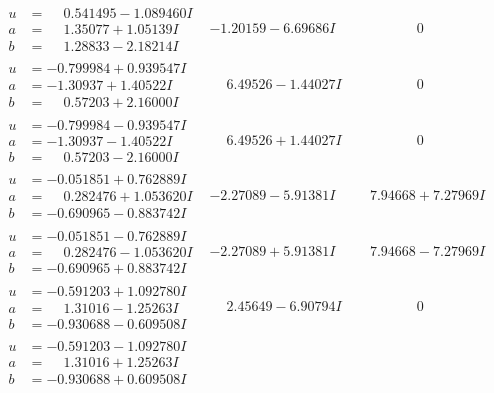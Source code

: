\documentclass[1p]{elsarticle_modified}
\theoremstyle{definition}
\begin{document}
$$\begin{array}{c|c|c}
 \hline 
\begin{aligned}
u &= \phantom{-}0.541495 - 1.089460 I \\
a &= \phantom{-}1.35077 + 1.05139 I \\
b &= \phantom{-}1.28833 - 2.18214 I\end{aligned}
 & -1.20159 - 6.69686 I & \phantom{-0.000000 } 0 \\ \hline\begin{aligned}
u &= -0.799984 + 0.939547 I \\
a &= -1.30937 + 1.40522 I \\
b &= \phantom{-}0.57203 + 2.16000 I\end{aligned}
 & \phantom{-}6.49526 - 1.44027 I & \phantom{-0.000000 } 0 \\ \hline\begin{aligned}
u &= -0.799984 - 0.939547 I \\
a &= -1.30937 - 1.40522 I \\
b &= \phantom{-}0.57203 - 2.16000 I\end{aligned}
 & \phantom{-}6.49526 + 1.44027 I & \phantom{-0.000000 } 0 \\ \hline\begin{aligned}
u &= -0.051851 + 0.762889 I \\
a &= \phantom{-}0.282476 + 1.053620 I \\
b &= -0.690965 - 0.883742 I\end{aligned}
 & -2.27089 - 5.91381 I & \phantom{-}7.94668 + 7.27969 I \\ \hline\begin{aligned}
u &= -0.051851 - 0.762889 I \\
a &= \phantom{-}0.282476 - 1.053620 I \\
b &= -0.690965 + 0.883742 I\end{aligned}
 & -2.27089 + 5.91381 I & \phantom{-}7.94668 - 7.27969 I \\ \hline\begin{aligned}
u &= -0.591203 + 1.092780 I \\
a &= \phantom{-}1.31016 - 1.25263 I \\
b &= -0.930688 - 0.609508 I\end{aligned}
 & \phantom{-}2.45649 - 6.90794 I & \phantom{-0.000000 } 0 \\ \hline\begin{aligned}
u &= -0.591203 - 1.092780 I \\
a &= \phantom{-}1.31016 + 1.25263 I \\
b &= -0.930688 + 0.609508 I\end{aligned}

\end{array}$$
\end{document}
